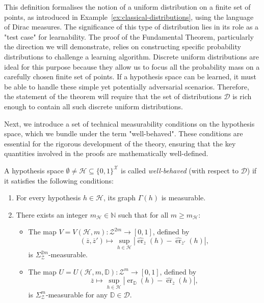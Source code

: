 This definition formalises the notion of a uniform distribution on a finite set of points, as introduced in Example~\ref{ex:classical-distributions}, using the language of Dirac measures. The significance of this type of distribution lies in its role as a "test case" for learnability. The proof of the Fundamental Theorem, particularly the direction we will demonstrate, relies on constructing specific probability distributions to challenge a learning algorithm. Discrete uniform distributions are ideal for this purpose because they allow us to focus all the probability mass on a carefully chosen finite set of points. If a hypothesis space can be learned, it must be able to handle these simple yet potentially adversarial scenarios. Therefore, the statement of the theorem will require that the set of distributions $\mathcal{D}$ is rich enough to contain all such discrete uniform distributions.

Next, we introduce a set of technical measurability conditions on the hypothesis space, which we bundle under the term "well-behaved". These conditions are essential for the rigorous development of the theory, ensuring that the key quantities involved in the proofs are mathematically well-defined.

\begin{definition}
    \label{def:well-behaved}
    A hypothesis space $\emptyset \neq \mathcal{H} \subseteq \{0,1\}^\mathcal{X}$ is called \emph{well-behaved} (with respect to $\mathcal{D}$) if it satisfies the following conditions:
    \begin{enumerate}
        \item For every hypothesis $h \in \mathcal{H}$, its graph $\Gamma(h)$ is measurable.
        \item There exists an integer $m_{\mathcal{H}} \in \mathbb{N}$ such that for all $m \ge m_{\mathcal{H}}$:
        \begin{itemize}
            \item The map $V = V(\mathcal{H}, m): \mathcal{Z}^{2m} \to [0,1]$, defined by
            \[
                (\overline{z}, \overline{z}') \mapsto \sup_{h \in \mathcal{H}} |\hat{\operatorname{er}}_{\overline{z}}(h) - \hat{\operatorname{er}}_{\overline{z}'}(h)|,
            \]
            is $\Sigma_{\mathcal{Z}}^{2m}$-measurable.
            \item The map $U = U(\mathcal{H}, m, \mathbb{D}): \mathcal{Z}^m \to [0,1]$, defined by
            \[
                \overline{z} \mapsto \sup_{h \in \mathcal{H}} |\operatorname{er}_{\mathbb{D}}(h) - \hat{\operatorname{er}}_{\overline{z}}(h)|,
            \]
            is $\Sigma_{\mathcal{Z}}^m$-measurable for any $\mathbb{D} \in \mathcal{D}$.
        \end{itemize}
    \end{enumerate}
\end{definition}


